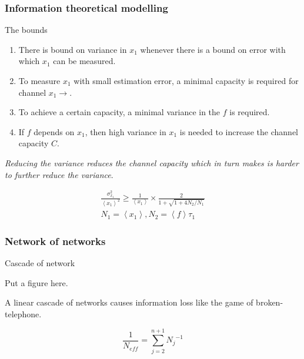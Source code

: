 \documentclass{beamer}
\begin{document}
\begin{frame}[fragile]
    \frametitle{Information theoretical modelling}
    
    \begin{block}{The bounds}
        \begin{enumerate}
                \small
            \item There is bound on variance in $x_1$ whenever there is a bound
                on error with which $x_1$ can be measured.
            \item To measure $x_1$ with small estimation error, a minimal
                capacity is required for channel $x_1 \rightarrow $.
            \item  To achieve a certain capacity, a minimal variance in the $f$
                is required.
            \item If $f$ depends on $x_1$, then high variance in $x_1$ is needed
                to increase the channel capacity $C$.
        \end{enumerate}

        \emph{Reducing the variance reduces the channel capacity which in turn
        makes is harder to further reduce the variance}.

    \end{block}

    \def\mean#1{\left< #1 \right>}
    \begin{eqnarray}
        \frac{\sigma_{x_1}^2}{\mean{x_1}^2} \geq 
        \frac{1}{\mean{x_1}} \times \frac{2}{1 + \sqrt{1+4N_2/N_1}} \\
        N_1 = \mean{x_1}, N_2 = \mean{f} \tau_1 
    \end{eqnarray}

\end{frame}
 
\begin{frame}
    \frametitle{Network of networks}

    \begin{block}{Cascade of network}

        Put a figure here.

        A linear cascade of networks causes information loss like the game of
        broken-telephone.

        \begin{equation}
            \frac{1}{N_{eff}} = \sum_{j=2}^{n+1} {N_j}^{-1}
        \end{equation}

    \end{block}
\end{frame}
\end{document}
